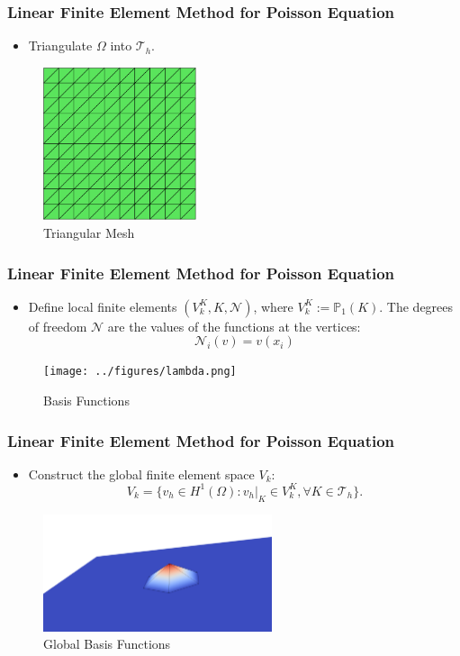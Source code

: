 \documentclass[notheorems,serif]{beamer}
\begin{document}
\begin{CJK}{UTF8}{gkai}
\begin{frame}
\end{frame}

\begin{frame}
\frametitle{Linear Finite Element Method for Poisson Equation}
\begin{itemize}
\item Triangulate $\Omega$ into $\mathcal{T}_h$.
\end{itemize}
\vspace{10pt}
\begin{figure}[htpb]
    \centering
    \includegraphics[width=0.4\textwidth]{../figures/struct_triangle_mesh.pdf}
    \caption{Triangular Mesh}
\end{figure}
\end{frame}

\begin{frame}
\frametitle{Linear Finite Element Method for Poisson Equation}
\begin{itemize}
\item Define local finite elements $(V_k^K, K, \mathcal{N})$, where $V_k^K :=
    \mathbb{P}_1(K)$. The degrees of freedom $\mathcal{N}$ are the values of the
    functions at the vertices:
    $$
    \mathcal{N}_i(v) = v(x_i)
    $$
\end{itemize}
\begin{figure}[htpb]
    \centering
    \texttt{[image: ../figures/lambda.png]}
    \caption{Basis Functions}
\end{figure}
\end{frame}

\begin{frame}
\frametitle{Linear Finite Element Method for Poisson Equation}
\begin{itemize}
\item Construct the global finite element space $V_k$:
    $$
    V_k = \{v_h \in H^1(\Omega): v_h|_K \in V_k^K, \forall K \in
    \mathcal{T}_h\}.
    $$
\end{itemize}
\begin{figure}[htpb]
    \centering
    \includegraphics[width=0.6\textwidth]{../figures/femfunction_global.png}
    \caption{Global Basis Functions}
\end{figure}
\end{frame}


\end{CJK}
\end{document}
